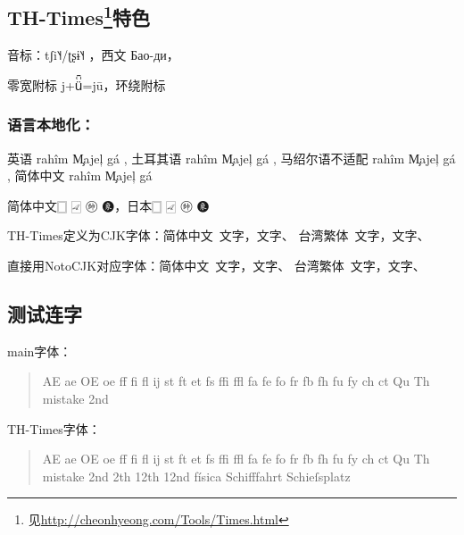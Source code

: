 \subsection[TH-Times特色]{TH-Times{\protect\footnote{见\url{http://cheonhyeong.com/Tools/Times.html}}}特色}
音标：{\fb tʃi˥˧/ʈʂɨ˥˧ }，西文 {\fb Бао-ди}，


零宽附标 {\fb j+ü᪻̄=jū}，环绕附标 {\fb Щ⃣ ​}

\subsubsection*{语言本地化：}

英语 {\fb rahîm M̧ajeļ gá}
, 土耳其语
    {\fbtk rahîm M̧ajeļ gá}
, 马绍尔语不适配
    {rahîm M̧ajeļ gá}
, 简体中文
    {\fbcn rahîm M̧ajeļ gá}

简体中文{\fbcn 🀆 🀐 🩠 🩩}，日本{\fbjp 🀆 🀐 🩠 🩩}

TH-Times定义为CJK字体：简体中文~文字{\fbcn ，}文字{\fbcn 、}\; 台湾繁体~{\cjktw 文字}{\fbpunctw ，}{\cjktw 文字}{\fbpunctw 、}

直接用NotoCJK对应字体：简体中文~{\cjkcn 文字，文字、}\; 台湾繁体~{\cjktw 文字，文字、}

\subsection{测试连字}

\noindent main字体：

\begin{quote}
    AE ae OE oe ff fi fl ij st ft et fs ffi ffl fa fe fo fr fb fh fu fy ch ct Qu Th mistake 2nd
\end{quote}


\noindent TH-Times字体：

\begin{quote}
    {\fb AE ae OE oe ff fi fl ij st ft et fs ffi ffl fa fe fo fr fb fh fu fy ch ct Qu Th mistake 2nd 2th 12th 12nd física Schiff‌fahrt Schieſ‍splat‍z}
\end{quote}


